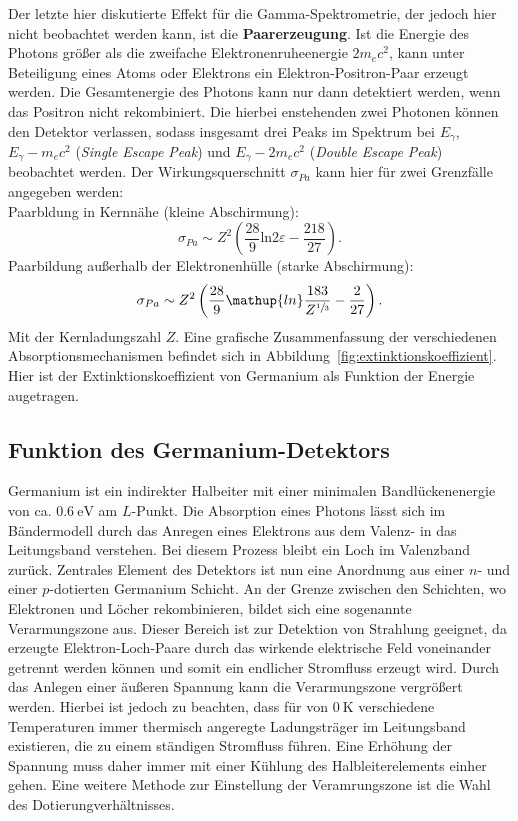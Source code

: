 Der letzte hier diskutierte Effekt für die Gamma-Spektrometrie, der jedoch hier nicht beobachtet werden kann, ist die
\textbf{Paarerzeugung}. Ist die Energie des Photons größer als die zweifache Elektronenruheenergie $2m_ec^2$,
kann unter Beteiligung eines Atoms oder Elektrons ein Elektron-Positron-Paar erzeugt werden. Die Gesamtenergie
des Photons kann nur dann detektiert werden, wenn das Positron nicht rekombiniert. Die hierbei enstehenden
zwei Photonen können den Detektor verlassen, sodass insgesamt drei Peaks im Spektrum bei $E_\gamma$, $E_\gamma - m_ec^2$ (\emph{Single Escape Peak}) 
und $E_\gamma - 2m_ec^2$ (\emph{Double Escape Peak}) beobachtet werden.
Der Wirkungsquerschnitt $\sigma_{Pa}$ kann hier für zwei Grenzfälle angegeben werden: \\
Paarbldung in Kernnähe (kleine Abschirmung):
\begin{equation}
    \sigma_{Pa} \sim Z^2\left(\frac{28}{9} \mathup{ln}2\varepsilon - \frac{218}{27} \right).
\end{equation}
Paarbildung außerhalb der Elektronenhülle (starke Abschirmung):
\begin{equation}
    \sigma_{Pa} \sim Z^2 \left(\frac{28}{9}\mathup{ln}\frac{183}{Z^{\sfrac{1}{3}}} - \frac{2}{27} \right).
\end{equation} 
Mit der Kernladungszahl $Z$. Eine grafische Zusammenfassung der verschiedenen 
Absorptionsmechanismen befindet sich in Abbildung~\ref{fig:extinktionskoeffizient}. Hier ist der Extinktionskoeffizient 
von Germanium als Funktion der Energie augetragen. 


\subsection{Funktion des Germanium-Detektors}
Germanium ist ein indirekter Halbeiter mit einer minimalen Bandlückenenergie von ca. $\SI{0.6}{\electronvolt}$ am $L$-Punkt.
Die Absorption eines Photons lässt sich im Bändermodell durch das Anregen eines Elektrons aus dem Valenz- in das
Leitungsband verstehen. Bei diesem Prozess bleibt ein Loch im Valenzband zurück. Zentrales Element des Detektors ist nun
eine Anordnung aus einer $n$- und einer $p$-dotierten Germanium Schicht. An der Grenze zwischen den Schichten, wo Elektronen
und Löcher rekombinieren, bildet sich eine sogenannte Verarmungszone aus. Dieser Bereich ist zur Detektion von Strahlung
geeignet, da erzeugte Elektron-Loch-Paare durch das wirkende elektrische Feld voneinander getrennt werden können und somit ein
endlicher Stromfluss erzeugt wird. Durch das Anlegen einer äußeren Spannung kann die Verarmungszone vergrößert werden. Hierbei ist jedoch
zu beachten, dass für von $\SI{0}{\kelvin}$ verschiedene Temperaturen immer thermisch angeregte Ladungsträger im Leitungsband existieren, die
zu einem ständigen Stromfluss führen. Eine Erhöhung der Spannung muss daher immer mit einer Kühlung des
Halbleiterelements einher gehen. Eine weitere Methode zur Einstellung der Veramrungszone ist die Wahl des Dotierungverhältnisses. 

